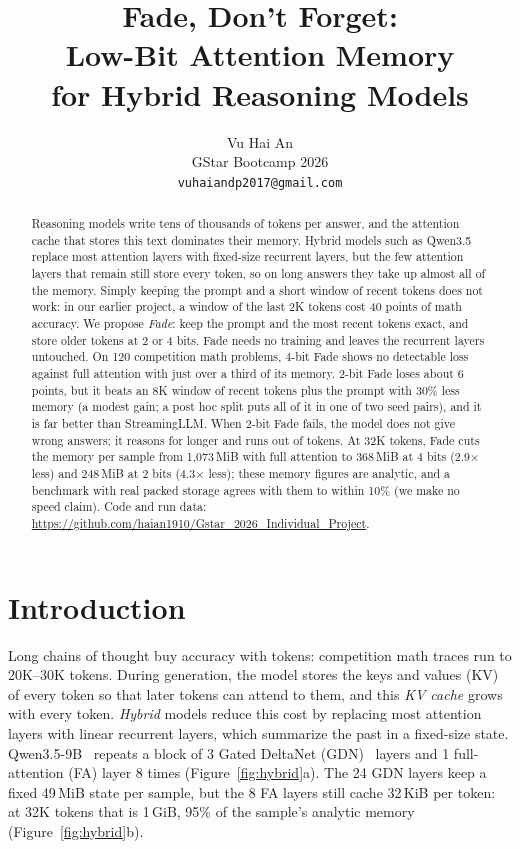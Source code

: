 \documentclass{article}
\title{Fade, Don't Forget:\\Low-Bit Attention Memory\\for Hybrid Reasoning Models}
\author{%
  Vu Hai An \\
  GStar Bootcamp 2026 \\
  \texttt{vuhaiandp2017@gmail.com}
}
\begin{document}
\maketitle

\vspace{-1.5em}
\begin{abstract}
Reasoning models write tens of thousands of tokens per answer, and the attention cache that stores this text dominates their memory. Hybrid models such as Qwen3.5 replace most attention layers with fixed-size recurrent layers, but the few attention layers that remain still store every token, so on long answers they take up almost all of the memory. Simply keeping the prompt and a short window of recent tokens does not work: in our earlier project, a window of the last 2K tokens cost 40 points of math accuracy. We propose \emph{Fade}: keep the prompt and the most recent tokens exact, and store older tokens at 2 or 4 bits. Fade needs no training and leaves the recurrent layers untouched. On 120 competition math problems, 4-bit Fade shows no detectable loss against full attention with just over a third of its memory. 2-bit Fade loses about 6 points, but it beats an 8K window of recent tokens plus the prompt with 30\% less memory (a modest gain; a post hoc split puts all of it in one of two seed pairs), and it is far better than StreamingLLM. When 2-bit Fade fails, the model does not give wrong answers; it reasons for longer and runs out of tokens. At 32K tokens, Fade cuts the memory per sample from 1,073\,MiB with full attention to 368\,MiB at 4 bits (2.9$\times$ less) and 248\,MiB at 2 bits (4.3$\times$ less); these memory figures are analytic, and a benchmark with real packed storage agrees with them to within 10\% (we make no speed claim). Code and run data: \url{https://github.com/haian1910/Gstar_2026_Individual_Project}.
\end{abstract}

\vspace{-0.6em}
\section{Introduction}
\vspace{-0.4em}
Long chains of thought buy accuracy with tokens: competition math traces run to 20K--30K tokens. During generation, the model stores the keys and values (KV) of every token so that later tokens can attend to them, and this \emph{KV cache} grows with every token. \emph{Hybrid} models reduce this cost by replacing most attention layers with linear recurrent layers, which summarize the past in a fixed-size state. Qwen3.5-9B~\cite{qwen35} repeats a block of 3 Gated DeltaNet (GDN)~\cite{gdn} layers and 1 full-attention (FA) layer 8 times (Figure~\ref{fig:hybrid}a). The 24 GDN layers keep a fixed 49\,MiB state per sample, but the 8 FA layers still cache 32\,KiB per token: at 32K tokens that is 1\,GiB, 95\% of the sample's analytic memory (Figure~\ref{fig:hybrid}b).
\end{document}
